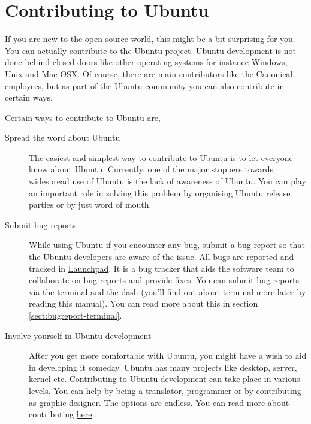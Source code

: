 \section{Contributing to Ubuntu} \label{chap:about_ubuntu_contribute} 
If you are new to the open source world, this might be a bit surprising for you. You can actually contribute to the Ubuntu project. Ubuntu development is not done behind closed doors like other operating systems for instance Windows, Unix and Mac OSX. Of course, there are main contributors like the Canonical employees, but as part of the Ubuntu community you can also contribute in certain ways. \\

\par \noindent Certain ways to contribute to Ubuntu are,

\begin{description}

\item [Spread the word about Ubuntu] The easiest and simplest way to contribute to Ubuntu is to let everyone know about Ubuntu. Currently, one of the major stoppers towards widespread use of Ubuntu is the lack of awareness of Ubuntu. You can play an important role in solving this problem by organising Ubuntu release parties or by just word of mouth.

\item [Submit bug reports] While using Ubuntu if you encounter any bug, submit a bug report so that the Ubuntu developers are aware of the issue. All bugs are reported and tracked in \href{https://launchpad.net/}{Launchpad}. It is a bug tracker that aids the software team to collaborate on bug reports and provide fixes. You can submit bug reports via the terminal and the dash (you'll find out about terminal more later by reading this manual). You can read more about this in section \ref{sect:bugreport-terminal}.

\item [Involve yourself in Ubuntu development] After you get more comfortable with Ubuntu, you might have a wish to aid in developing it someday. Ubuntu has many projects like desktop, server, kernel etc. Contributing to Ubuntu development can take place in various levels. You can help by being a translator, programmer or by contributing as graphic designer. The options are endless. You can read more about contributing \href{http://developer.ubuntu.com/}{here} .

\end{description}

